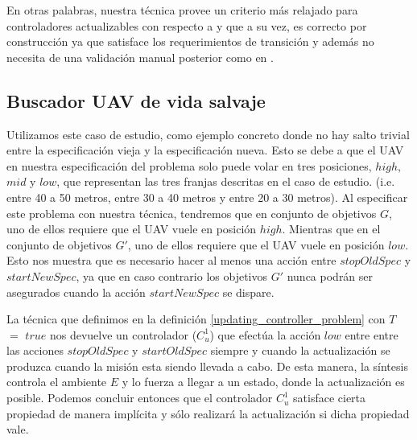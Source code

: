 En otras palabras, nuestra técnica provee un criterio más relajado para controladores actualizables con respecto a
\cite{6224401} y que a su vez, es correcto por construcción ya que satisface los requerimientos de transición y además
no necesita de una validación manual posterior como en \cite{PanzicaLaManna:2013:FCC:2487336.2487349}.



\subsection{Buscador UAV de vida salvaje}

Utilizamos este caso de estudio, como ejemplo concreto donde no hay salto trivial entre la especificación vieja y la
especificación nueva. Esto se debe a que el UAV en nuestra especificación del problema solo puede volar en tres
posiciones, $high$, $mid$ y $low$, que representan las tres franjas descritas en el caso de estudio. (i.e. entre 40 a 50
metros, entre 30 a 40 metros y entre 20 a 30 metros). Al especificar este problema con nuestra técnica, tendremos que en
conjunto de objetivos $G$, uno de ellos requiere que el UAV vuele en posición $high$. Mientras que en el conjunto de
objetivos $G'$, uno de ellos requiere que el UAV vuele en posición $low$. Esto nos muestra que es necesario hacer
al menos una acción entre $stopOldSpec$ y $startNewSpec$, ya que en caso contrario los objetivos $G'$ nunca podrán ser
asegurados cuando la acción $startNewSpec$ se dispare.

La técnica que definimos en la definición \ref{updating_controller_problem} con $T$ $=$ $true$ nos devuelve un controlador
($C_u^{1}$) que efectúa la acción $low$ entre entre las acciones $stopOldSpec$ y $startOldSpec$ siempre y cuando la
actualización se produzca cuando la misión esta siendo llevada a cabo. De esta manera, la síntesis controla el ambiente
$E$ y lo fuerza a llegar a un estado, donde la actualización es posible. Podemos concluir entonces que el controlador
$C_u^1$ satisface cierta propiedad de manera implícita y sólo realizará la actualización si dicha propiedad vale.

